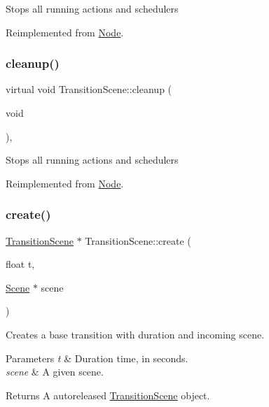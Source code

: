 Stops all running actions and schedulers 

Reimplemented from \hyperlink{classNode_aa2de84c6cdeec9cd647d236c30ee0567}{Node}.

\mbox{\label{classTransitionScene_aac61fc66f0b5447ba999cbfda5d0a926}} 
\subsubsection{\texorpdfstring{cleanup()}{cleanup()}\hspace{0.1cm}{\footnotesize\ttfamily [2/2]}}
{\footnotesize\ttfamily virtual void Transition\+Scene\+::cleanup (\begin{DoxyParamCaption}\item[{void}]{ }\end{DoxyParamCaption})\hspace{0.3cm}{\ttfamily [override]}, {\ttfamily [virtual]}}

Stops all running actions and schedulers 

Reimplemented from \hyperlink{classNode_aa2de84c6cdeec9cd647d236c30ee0567}{Node}.

\mbox{\label{classTransitionScene_a9e6d44253a5d89c7654dce59a3be2966}} 
\subsubsection{\texorpdfstring{create()}{create()}\hspace{0.1cm}{\footnotesize\ttfamily [1/2]}}
{\footnotesize\ttfamily \hyperlink{classTransitionScene}{Transition\+Scene} $\ast$ Transition\+Scene\+::create (\begin{DoxyParamCaption}\item[{float}]{t,  }\item[{\hyperlink{classScene}{Scene} $\ast$}]{scene }\end{DoxyParamCaption})\hspace{0.3cm}{\ttfamily [static]}}

Creates a base transition with duration and incoming scene.


\begin{DoxyParams}{Parameters}
{\em t} & Duration time, in seconds. \\
\hline
{\em scene} & A given scene. \\
\hline
\end{DoxyParams}
\begin{DoxyReturn}{Returns}
A autoreleased \hyperlink{classTransitionScene}{Transition\+Scene} object. 
\end{DoxyReturn}
\mbox{\label{classTransitionScene_a48badee255dab1d2d52bebe85c670a10}} 
